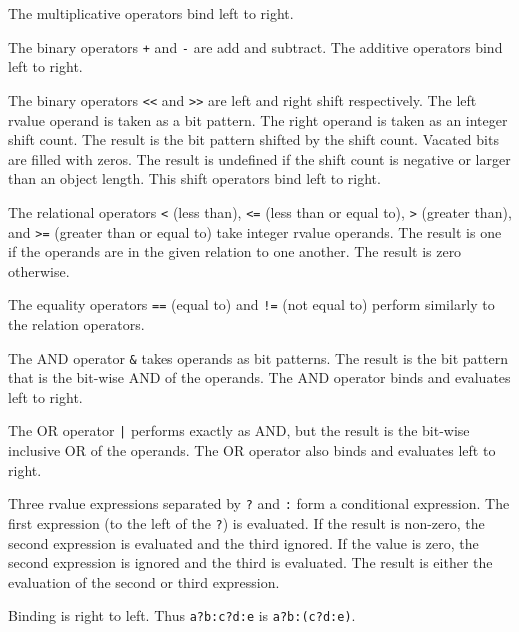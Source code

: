 \documentclass[12pt]{report}
\begin{document}
The multiplicative operators bind left to right.


The binary operators \verb|+| and \verb|-| are add and subtract.  The
additive operators bind left to right.


The binary operators \verb|<<| and \verb|>>| are left and right shift
respectively.  The left rvalue operand is taken as a bit pattern.  The
right operand is taken as an integer shift count.  The result is the
bit pattern shifted by the shift count. Vacated bits are filled with
zeros. The result is undefined if the shift count is negative or
larger than an object length. This shift operators bind left to right.


The relational operators \verb|<| (less than), \verb|<=| (less than or
equal to), \verb|>| (greater than), and \verb|>=| (greater than or
equal to) take integer rvalue operands.  The result is one if the
operands are in the given relation to one another.  The result is zero
otherwise.


The equality operators \verb|==| (equal to) and \verb|!=| (not equal
to) perform similarly to the relation operators.


The AND operator \verb|&| takes operands as bit patterns.  The result
is the bit pattern that is the bit-wise AND of the operands.  The AND
operator binds and evaluates left to right.


The OR operator \verb$|$ performs exactly as AND, but the result is
the bit-wise inclusive OR of the operands.  The OR operator also binds
and evaluates left to right.


Three rvalue expressions separated by \verb|?| and \verb|:| form a
conditional expression.  The first expression (to the left of the
\verb|?|) is evaluated.  If the result is non-zero, the second
expression is evaluated and the third ignored.  If the value is zero,
the second expression is ignored and the third is evaluated.  The
result is either the evaluation of the second or third expression.

Binding is right to left. Thus \verb|a?b:c?d:e| is \verb|a?b:(c?d:e)|.
\end{document}
